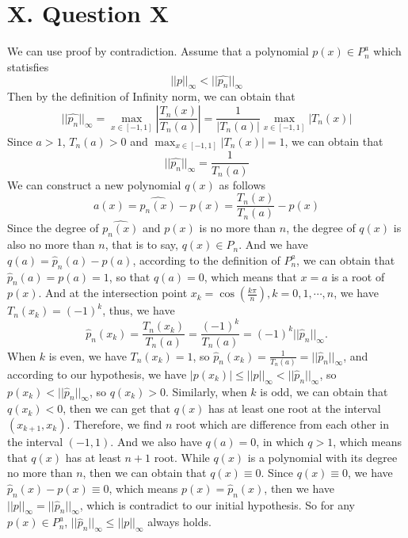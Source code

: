 \documentclass[a4paper]{article}
\begin{document}
\section*{X. Question X}
We can use proof by contradiction. Assume that a polynomial $p(x)\in P_n^a$ which statisfies
\begin{equation}
  ||p||_{\infty}<||\hat{p_n}||_{\infty}
\end{equation}
Then by the definition of Infinity norm, we can obtain that
\begin{equation}
  ||\hat{p_n}||_{\infty}=\max_{x\in[-1,1]}|\frac{T_n(x)}{T_n(a)}|=\frac{1}{|T_n(a)|}\max_{x\in[-1,1]}|T_n(x)|
\end{equation}
Since $a>1$, $T_n(a)>0$ and $\max_{x\in[-1,1]}|T_n(x)|=1$, we can obtain that
\begin{equation}
  ||\hat{p_n}||_{\infty}=\frac{1}{T_n(a)}
\end{equation}
We can construct a new polynomial $q(x)$ as follows
\begin{equation}
  a(x)=\hat{p_n(x)}-p(x)=\frac{T_n(x)}{T_n(a)}-p(x)
\end{equation}
Since the degree of $\hat{p_n(x)}$ and $p(x)$ is no more than $n$, the degree of $q(x)$ is also no more than $n$, that is to say, $q(x)\in P_n$. And we have 
$q(a)=\hat{p}_{n}(a)-p(a)$, according to the definition of $P_n^a$, we can obtain that $\hat{p}_{n}(a)=p(a)=1$, so that $q(a)=0$, which means that $x=a$ is a root
of $p(x)$. And at the intersection point $x_k=\cos(\frac{k\pi}{n}),k=0,1,\cdots,n$, we have $T_n(x_k)=(-1)^k$, thus, we have
\begin{equation}
  \hat{p}_n(x_k)=\frac{T_n(x_k)}{T_n(a)}=\frac{(-1)^k}{T_n(a)}=(-1)^k||\hat{p}_n||_{\infty}.
\end{equation}
When $k$ is even, we have $T_n(x_k)=1$, so $\hat{p}_n(x_k)=\frac{1}{T_n(a)}=||\hat{p}_n||_{\infty}$, and according to our hypothesis, we have $|p(x_k)|\leq ||p||_{\infty}<||\hat{p}_n||_{\infty}$,
so $p(x_k)<||\hat{p}_n||_{\infty}$, so $q(x_k)>0$. Similarly, when $k$ is odd, we can obtain that $q(x_k)<0$, then we can get that $q(x)$ has at least one root at the interval $(x_{k+1},x_k)$. Therefore,
we find $n$ root which are difference from each other in the interval $(-1,1)$. And we also have $q(a)=0$, in which $q>1$, which means that $q(x)$ has at least $n+1$ root. While $q(x)$ is a polynomial with its degree
no more than $n$, then we can obtain that $q(x)\equiv 0$.
Since $q(x)\equiv 0$, we have $\hat{p}_n(x)-p(x)\equiv 0$, which means $p(x)=\hat{p}_n(x)$, then we have $||p||_{\infty}=||\hat{p}_n||_{\infty}$, which is contradict to our initial hypothesis.
So for any $p(x)\in P_n^a$, $||\hat{p}_n||_{\infty}\leq ||p||_{\infty}$ always holds.
\end{document}
